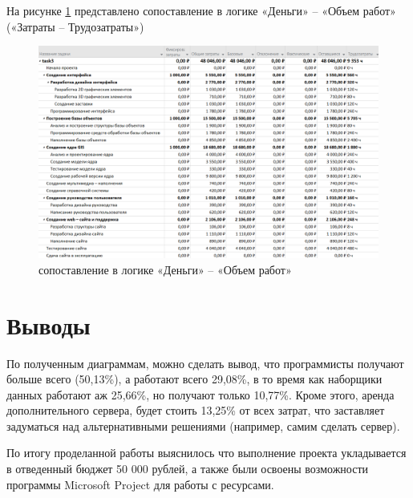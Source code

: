 \newpage
На рисунке \ref{p9} представлено сопоставление в логике «Деньги» – «Объем работ» («Затраты – Трудозатраты»)
\begin{figure}[!h]
	\centering
	\includegraphics[width=1\linewidth]{inc/img/9.png}
	\caption{сопоставление в логике «Деньги» – «Объем работ»}
	\label{p9}
\end{figure}

\section*{Выводы}
По полученным диаграммам, можно сделать вывод, что программисты получают больше всего (50,13\%), а работают всего 29,08\%, в то время как наборщики данных работают аж 25,66\%, но получают только 10,77\%. Кроме этого, аренда дополнительного сервера, будет стоить 13,25\% от всех затрат, что заставляет задуматься над альтернативными решениями (например, самим сделать сервер).

По итогу проделанной работы выяснилось что выполнение проекта укладывается в отведенный бюджет 50 000 рублей, а также были освоены возможности программы Microsoft Project для работы с ресурсами.